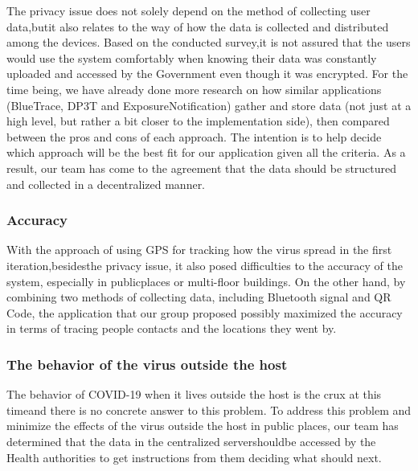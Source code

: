 \begin{itemize}
          \par The privacy issue does not solely depend on the  method of collecting user data,butit also relates to the way of how the data is collected and distributed among the devices. Based on the conducted survey,it is not assured that the users would use the system comfortably when knowing their data was constantly uploaded and accessed by the Government even though it was  encrypted. For  the  time  being,  we  have  already  done  more  research  on  how  similar applications (BlueTrace, DP3T and ExposureNotification) gather and store data (not just at a high level, but rather a bit closer to the implementation side), then compared between the pros and cons of each approach. The intention is to help decide which approach will be the best fit for our application given all the criteria. As a result, our team has come to the agreement that the data should be structured and collected in a decentralized manner.
      \end{itemize}
    
    \subsubsection{Accuracy}
      \par With the approach of using GPS for tracking how the virus spread in the first iteration,besidesthe privacy issue, it also posed difficulties to the accuracy of the system, especially in publicplaces or multi-floor buildings. On the other hand, by combining two methods of collecting data, including Bluetooth signal and QR Code, the application that our group proposed possibly maximized the accuracy in terms of tracing people contacts and the locations they went by.
    
    \subsubsection{The behavior of the virus outside the host}
      \par The behavior of COVID-19 when it lives outside the host is the crux at this timeand there is no concrete answer to this problem. To address this problem and minimize the effects of the virus  outside  the  host  in  public  places, our  team  has  determined  that the  data  in  the centralized servershouldbe accessed by the Health authorities to get instructions from them deciding what should next.
    
